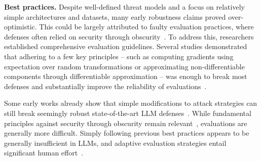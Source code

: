 
\textbf{Best practices.} Despite well-defined threat models and a focus on relatively simple architectures and datasets, many early robustness claims proved over-optimistic. This could be largely attributed to faulty evaluation practices, where defenses often relied on security through obscurity~\cite{athalye_obfuscated_2018}. To address this, researchers established comprehensive evaluation guidelines. Several studies demonstrated that adhering to a few key principles -- such as computing gradients using expectation over random transformations or approximating non-differentiable components through differentiable approximation -- was enough to break most defenses and substantially improve the reliability of evaluations~\cite{athalye_obfuscated_2018, uesato2018adversarial}. 

Some early works already show that simple modifications to attack strategies can still break seemingly robust state-of-the-art LLM defenses~\cite{schwinn2024revisiting, thompson2024flrt}. While fundamental principles against security through obscurity remain relevant~\cite{athalye_obfuscated_2018}, evaluations are generally more difficult. Simply following previous best practices appears to be generally insufficient in LLMs, and adaptive evaluation strategies entail significant human effort~\cite{andriushchenko2024jailbreaking}. 

